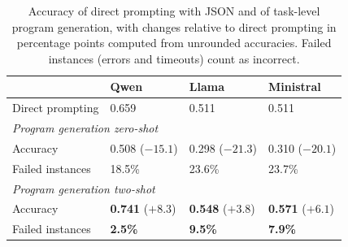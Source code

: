 \begin{table}[t]
\centering
\caption{Accuracy of direct prompting with JSON and of task-level program generation, with changes relative to direct prompting in percentage points computed from unrounded accuracies. Failed instances (errors and timeouts) count as incorrect.}
\label{tab:rq3_pot_accuracy}
\begin{tabularx}{\columnwidth}{lXXX}
\toprule
 & Qwen & Llama & Ministral \\
\midrule
Direct prompting & 0.659 & 0.511 & 0.511 \\
\midrule
\multicolumn{4}{l}{\textit{Program generation zero-shot}} \\
\quad Accuracy & 0.508 ($-15.1$) & 0.298 ($-21.3$) & 0.310 ($-20.1$) \\
\quad Failed instances & 18.5\% & 23.6\% & 23.7\% \\
\midrule
\multicolumn{4}{l}{\textit{Program generation two-shot}} \\
\quad Accuracy & \textbf{0.741} ($+8.3$) & \textbf{0.548} ($+3.8$) & \textbf{0.571} ($+6.1$) \\
\quad Failed instances & \textbf{2.5\%} & \textbf{9.5\%} & \textbf{7.9\%} \\
\bottomrule
\end{tabularx}
\end{table}
